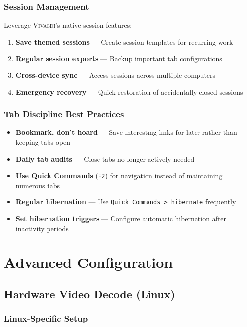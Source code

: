 \documentclass[11pt,a4paper,oneside]{book}
\newcommand{\vivaldi}{\textsc{Vivaldi}}
\newcommand{\keystroke}[1]{\texttt{\color{primaryblue}#1}}
\begin{document}
\subsection{Session Management}

Leverage \vivaldi{}'s native session features:

\begin{enumerate}
    \item \textbf{Save themed sessions} — Create session templates for recurring work
    \item \textbf{Regular session exports} — Backup important tab configurations
    \item \textbf{Cross-device sync} — Access sessions across multiple computers
    \item \textbf{Emergency recovery} — Quick restoration of accidentally closed sessions
\end{enumerate}

\subsection{Tab Discipline Best Practices}

\begin{itemize}
    \item \textbf{Bookmark, don't hoard} — Save interesting links for later rather than keeping tabs open
    \item \textbf{Daily tab audits} — Close tabs no longer actively needed
    \item \textbf{Use Quick Commands} (\keystroke{F2}) for navigation instead of maintaining numerous tabs
    \item \textbf{Regular hibernation} — Use \keystroke{Quick Commands > hibernate} frequently
    \item \textbf{Set hibernation triggers} — Configure automatic hibernation after inactivity periods
\end{itemize}

\chapter{Advanced Configuration}

\section{Hardware Video Decode (Linux)}

\subsection{Linux-Specific Setup}
\end{document}
